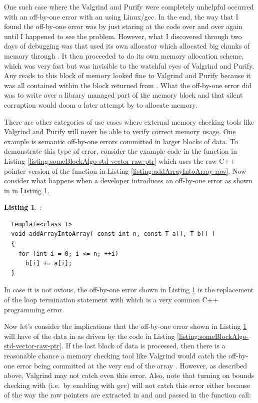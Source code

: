 \documentclass[pdf,ps2pdf,11pt]{SANDreport}
\newtheorem{listing}{Listing}
\begin{document}
One such case where the Valgrind and Purify were completely unhelpful
occurred with an off-by-one error with an {} using
Linux/gcc.  In the end, the way that I found the off-by-one error was
by just staring at the code over and over again until I happened to
see the problem.  However, what I discovered through two days of
debugging was that {} used its own allocator which
allocated big chunks of memory through {}.  It
then proceeded to do its own memory allocation scheme, which was very
fast but was invisible to the watchful eyes of Valgrind and Purify.
Any reads to this block of memory looked fine to Valgrind and Purify
because it was all contained within the block returned from
{}.  What the off-by-one error did was to write
over a library managed part of the memory block and that silent
corruption would doom a later attempt by {} to
allocate memory.

There are other categories of use cases where external memory checking
tools like Valgrind and Purify will never be able to verify correct
memory usage.  One example is semantic off-by-one errors committed in
larger blocks of data.  To demonstrate this type of error, consider
the example code in the function {} in
Listing {}\ref{listing:someBlockAlgo-std-vector-raw-ptr} which uses
the raw C++ pointer version of the function
{} in Listing
{}\ref{listing:addArrayIntoArray-raw}.  Now consider what happens when
a developer introduces an off-by-one error as shown in
{} in Listing
{}\ref{listing:addArrayIntoArray_rawError}.

\begin{listing}:\\
\label{listing:addArrayIntoArray_rawError}
{\small\begin{verbatim}
  template<class T>
  void addArrayIntoArray( const int n, const T a[], T b[] )
  {
    for (int i = 0; i <= n; ++i)
      b[i] += a[i];
  }
\end{verbatim}}
\end{listing}

In case it is not ovious, the off-by-one error shown in Listing
{}\ref{listing:addArrayIntoArray_rawError} is the replacement of the
loop termination statement {} with {} which is
a very common C++ programming error.

Now let's consider the implications that the off-by-one error shown in
Listing {}\ref{listing:addArrayIntoArray_rawError} will have of the
data in {} as driven by the code in Listing
{}\ref{listing:someBlockAlgo-std-vector-raw-ptr}.  If the last block
{} of data is processed, then there is a
reasonable chance a memory checking tool like Valgrind would catch the
off-by-one error being committed at the very end of the array
{}.  However, as described above, Valgrind may not
catch even this error.  Also, note that turning on bounds checking
with {} (i.e.\ by enabling
{} with gcc) will not catch this error
either because of the way the raw pointers are extracted in and and
passed in the function call:
\end{document}
